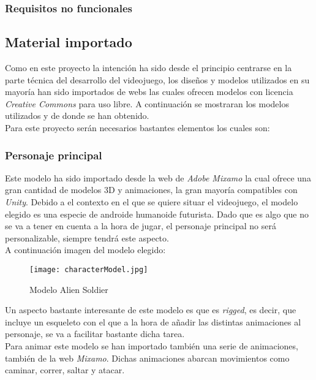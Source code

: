 \subsubsection{Requisitos no funcionales}


\subsection{Material importado}

Como en este proyecto la intención ha sido desde el principio centrarse en la parte técnica del desarrollo
del videojuego, los diseños y modelos utilizados en su mayoría han sido importados de webs las cuales
ofrecen modelos con licencia \textit{Creative Commons} para uso libre. A continuación se mostraran los modelos utilizados 
y de donde se han obtenido.\\
Para este proyecto serán necesarios bastantes elementos los cuales son:

\subsubsection{Personaje principal}
Este modelo ha sido importado desde la web de \textit{Adobe Mixamo} \cite{Mixamo} la cual ofrece una gran cantidad de modelos 3D
y animaciones, la gran mayoría compatibles con \textit{Unity}. Debido a el contexto en el que se quiere situar
el videojuego, el modelo elegido es una especie de androide humanoide futurista. Dado que es algo que no se va a tener en cuenta a la hora de
jugar, el personaje principal no será personalizable, siempre tendrá este aspecto. \\
A continuación imagen del modelo elegido: 

\begin{figure}[htbp]
\centering
\texttt{[image: characterModel.jpg]}
\caption{Modelo Alien Soldier}
\end{figure}

Un aspecto bastante interesante de este modelo es que es \textit{rigged}, es decir, que incluye
un esqueleto con el que a la hora de añadir las distintas animaciones al personaje, se va a facilitar bastante dicha tarea. \\

Para animar este modelo se han importado también una serie de animaciones, también de la web
\textit{Mixamo}. Dichas animaciones abarcan movimientos como caminar, correr, saltar y atacar.

